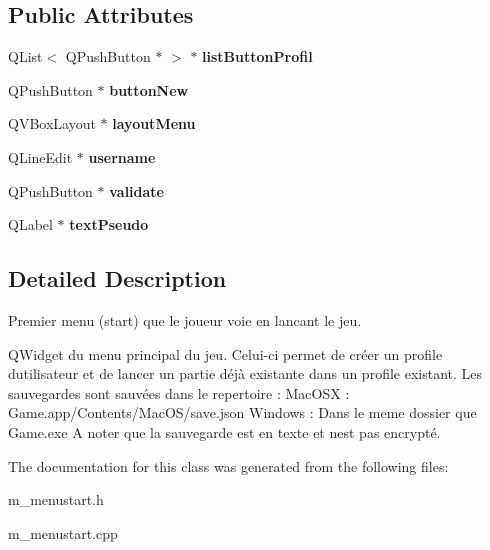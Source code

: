 \subsection*{Public Attributes}
\begin{DoxyCompactItemize}
\item 
\hypertarget{class_menu_start_a04d0eac4832176f91f62172757ce0616}{}Q\+List$<$ Q\+Push\+Button $\ast$ $>$ $\ast$ {\bfseries list\+Button\+Profil}\label{class_menu_start_a04d0eac4832176f91f62172757ce0616}

\item 
\hypertarget{class_menu_start_af01ac293a06b0da924be0ad29aa587cf}{}Q\+Push\+Button $\ast$ {\bfseries button\+New}\label{class_menu_start_af01ac293a06b0da924be0ad29aa587cf}

\item 
\hypertarget{class_menu_start_a9426199e93ab1722b19b4e4e178b0164}{}Q\+V\+Box\+Layout $\ast$ {\bfseries layout\+Menu}\label{class_menu_start_a9426199e93ab1722b19b4e4e178b0164}

\item 
\hypertarget{class_menu_start_abf21ea1841ef22859a15b1c201b8bbf6}{}Q\+Line\+Edit $\ast$ {\bfseries username}\label{class_menu_start_abf21ea1841ef22859a15b1c201b8bbf6}

\item 
\hypertarget{class_menu_start_a06ebe4101b60777e4e1465e1073d533b}{}Q\+Push\+Button $\ast$ {\bfseries validate}\label{class_menu_start_a06ebe4101b60777e4e1465e1073d533b}

\item 
\hypertarget{class_menu_start_a427333babe7349783094bc9257462cb0}{}Q\+Label $\ast$ {\bfseries text\+Pseudo}\label{class_menu_start_a427333babe7349783094bc9257462cb0}

\end{DoxyCompactItemize}


\subsection{Detailed Description}
Premier menu (start) que le joueur voie en lancant le jeu. 

Q\+Widget du menu principal du jeu. Celui-\/ci permet de créer un profile d\textquotesingle{}utilisateur et de lancer un partie déjà existante dans un profile existant. Les sauvegardes sont sauvées dans le repertoire \+: Mac\+O\+S\+X \+: Game.\+app/\+Contents/\+Mac\+O\+S/save.json Windows \+: Dans le meme dossier que Game.\+exe A noter que la sauvegarde est en texte et n\textquotesingle{}est pas encrypté. 

The documentation for this class was generated from the following files\+:\begin{DoxyCompactItemize}
\item 
m\+\_\+menustart.\+h\item 
m\+\_\+menustart.\+cpp\end{DoxyCompactItemize}
